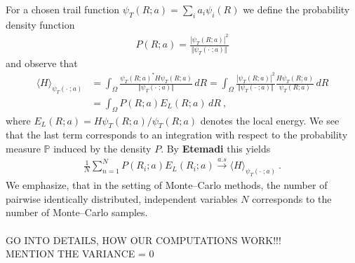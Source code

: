 \documentclass[11pt,a4paper]{article}
\numberwithin{equation}{section}
\begin{document}
For a chosen trail function $\psi_T(R;a)=\sum_{i}a_i\psi_i(R)$ we define the probability density function 
\begin{align*}
P(R;a) = \frac{|\psi_T(R;a)|^2}{\Vert \psi_T(\cdot\;;a)\Vert}
\end{align*} 
and observe that 
\begin{align*}
\langle H \rangle_{\psi_T(\cdot\;;a)} 
&= \int_{\Omega}\frac{\psi_T(R;a)^*H\psi_T(R;a)}{\Vert \psi_T(\cdot\;;a)\Vert}\,dR
=\int_{\Omega} \frac{|\psi_T(R;a)|^2}{\Vert \psi_T(\cdot\;;a)\Vert}\frac{H\psi_T(R;a)}{\psi_T(R;a)}\,dR\\
&=\int_{\Omega} P(R;a)E_L(R;a)\,dR~,
\end{align*}
where $E_L(R;a) = H\psi_T(R;a)/\psi_T(R;a)$ denotes the local energy. 
%
We see that the last term corresponds to an integration with respect to the probability measure $\mathbb{P}$ induced by the density $P$.
%
By \textbf{Etemadi} this yields
\begin{align*}
\label{eq:StrongLawofBN}
\frac{1}{N}\sum_{n=1}^NP(R_i;a)E_L(R_i;a)\overset{a.s}{\longrightarrow}\langle H \rangle_{\psi_T(\cdot\;;a)}~.
\end{align*}
We emphasize, that in the setting of Monte--Carlo methods, the number of pairwise identically distributed, independent variables $N$ corresponds to the number of  Monte--Carlo samples.\\
\\
GO INTO DETAILS, HOW OUR COMPUTATIONS WORK!!!\\
MENTION THE VARIANCE = 0\\
\\
\end{document}
